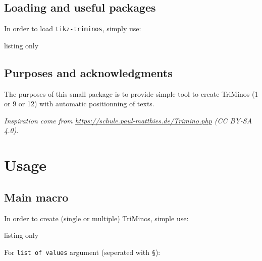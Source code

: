 \documentclass[11pt,a4paper]{ltxdoc}
\begin{document}
\subsection{Loading and useful packages}

In order to load \lstinline[language={[latex]TeX},basicstyle=\ttfamily]{tikz-triminos}, simply use:

\begin{DemoCode}{listing only}
\usepackage{tikz-triminos}
\end{DemoCode}


\subsection{Purposes and acknowledgments}

The purposes of this small package is to provide simple tool to create \textsf{TriMinos} (1 or 9 or 12) with automatic positionning of texts.

\smallskip

\textit{Inspiration come from \url{https://schule.paul-matthies.de/Trimino.php} (CC BY-SA 4.0)}.

\section{Usage}

\subsection{Main macro}

In order to create (single or multiple) \textsf{TriMinos}, simple use:

\begin{DemoCode}{listing only}
\end{DemoCode}

For \texttt{list of values} argument (seperated with \texttt{§}):
\end{document}
